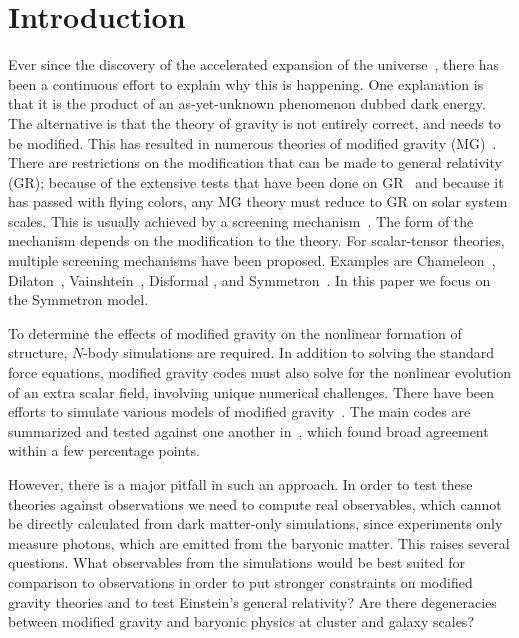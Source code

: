 \documentclass{aa}
\begin{document}
\section{Introduction}
Ever since the discovery of the accelerated expansion of the universe~\citep{riess1998observational,perlmutter1999measurements}, there has been a continuous effort to explain why this is happening. One explanation is that it is the product of an as-yet-unknown phenomenon dubbed dark energy. The alternative is that the theory of gravity is not entirely correct, and needs to be modified. This has resulted in numerous theories of modified gravity (MG)~\citep{carroll2005cosmology,nojiri2006modified,nojiri2007introduction,nojiri2011unified,skordis,clifton2011modified}. There are restrictions on the modification that can be made to general relativity (GR); because of the extensive tests that have been done on GR~\citep{terukina2014testing,euclid,wilcox2015xmm} and because  it has passed with flying colors, any MG theory must reduce to GR on solar system scales. This is usually achieved by a  screening mechanism~\citep{kimura2012vainshtein}. The form of the mechanism depends on the modification to the theory. For scalar-tensor theories,  multiple screening mechanisms have been proposed. Examples are Chameleon~\citep{khoury2004chameleon}, Dilaton~\citep{gasperini2001quintessence}, Vainshtein~\citep{vainshtein1972problem}, Disformal \citep{tomi}, and Symmetron~\citep{hinterbichler2010screening}. In this paper we focus on the Symmetron model.

To determine the effects of modified gravity on the  nonlinear formation of structure, $N$-body simulations are required. In addition to solving the standard force equations, modified gravity codes must also solve for the nonlinear evolution of an extra scalar field, involving unique numerical challenges. 
There have been efforts to simulate various models of modified gravity~\citep{hans,oyaizu2008nonlinear1,li2009structure,schmidt2009self,li2011n,li2012ecosmog,brax2013systematic,claudio,llinares2013releasing,falck2014vainshtein}. The main codes are summarized and tested against one another in~\citet{winther2015modified}, which found broad agreement within a few percentage points.

However, there is a major pitfall in such an approach. In order to test these theories against observations we need to compute real observables, which  cannot be directly calculated from dark matter-only simulations, since experiments only measure photons, which are emitted from the baryonic matter. 
This raises several questions. What observables from the simulations would be best suited for comparison to observations in order to put stronger constraints on modified gravity theories and to test Einstein's general relativity? Are there degeneracies between modified gravity and baryonic physics at cluster and galaxy scales? 
\end{document}
